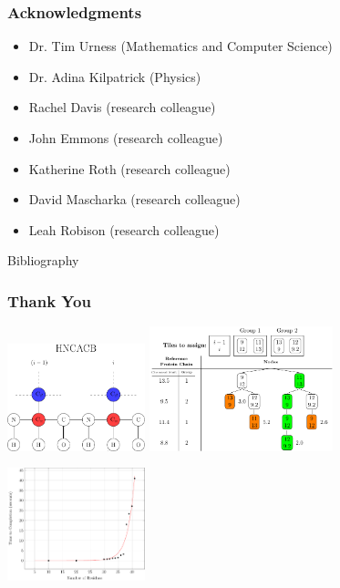 \documentclass{beamer}
\begin{document}
\begin{frame}
	\frametitle{Acknowledgments}
	\begin{itemize}
		\item Dr. Tim Urness (Mathematics and Computer Science)
		\item Dr. Adina Kilpatrick (Physics)
		\item Rachel Davis (research colleague)
		\item John Emmons (research colleague)
		\item  Katherine Roth (research colleague)
		\item  David Mascharka (research colleague)
		\item  Leah Robison (research colleague)
	\end{itemize}
\end{frame} 

\begin{frame}{Bibliography}
\nocite{*}


\end{frame}

\begin{frame}
	\frametitle{Thank You} 
	\begin{center}
	\includegraphics[width=0.3\textwidth]{diagram}\hspace{2em}
	\includegraphics[width=0.4\textwidth]{tilePlacement/step10}
	\end{center}
	\begin{center}
	\includegraphics[width=0.3\textwidth]{plot}\hspace{2em}
	\resizebox{!}{.3\paperheight}{}
\end{center}
\end{frame}
\end{document}
